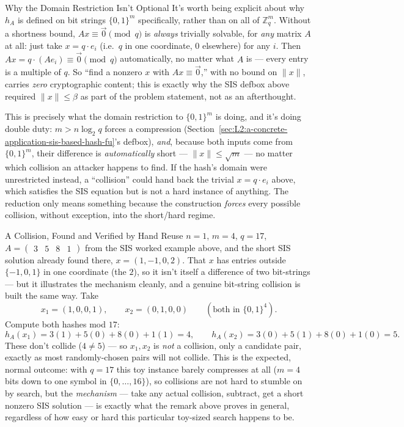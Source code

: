 \begin{rmkbox}{Why the Domain Restriction Isn't Optional}
It's worth being explicit about why $h_A$ is defined on bit strings $\{0,1\}^m$ specifically, rather than on all of $\mathbb{Z}_q^m$. Without a shortness bound, $Ax \equiv \vec 0 \pmod q$ is \emph{always} trivially solvable, for \emph{any} matrix $A$ at all: just take $x = q \cdot e_i$ (i.e.\ $q$ in one coordinate, $0$ elsewhere) for any $i$. Then $Ax = q\cdot(Ae_i) \equiv \vec 0 \pmod q$ automatically, no matter what $A$ is --- every entry is a multiple of $q$. So ``find a nonzero $x$ with $Ax\equiv\vec 0$,'' with no bound on $\|x\|$, carries \emph{zero} cryptographic content; this is exactly why the SIS defbox above required $\|x\|\le\beta$ as part of the problem statement, not as an afterthought.

This is precisely what the domain restriction to $\{0,1\}^m$ is doing, and it's doing double duty: $m > n\log_2 q$ forces a compression (Section~\ref{sec:L2:a-concrete-application-sis-based-hash-fu}'s defbox), \emph{and}, because both inputs come from $\{0,1\}^m$, their difference is \emph{automatically} short --- $\|x\|\le\sqrt m$ --- no matter which collision an attacker happens to find. If the hash's domain were unrestricted instead, a ``collision'' could hand back the trivial $x=q\cdot e_i$ above, which satisfies the SIS equation but is not a hard instance of anything. The reduction only means something because the construction \emph{forces} every possible collision, without exception, into the short/hard regime.
\end{rmkbox}

\begin{exbox}{A Collision, Found and Verified by Hand}
Reuse $n=1$, $m=4$, $q=17$, $A = \begin{pmatrix}3 & 5 & 8 & 1\end{pmatrix}$ from the SIS worked example above, and the short SIS solution already found there, $x = (1,-1,0,2)$. That $x$ has entries outside $\{-1,0,1\}$ in one coordinate (the $2$), so it isn't itself a difference of two bit-strings --- but it illustrates the mechanism cleanly, and a genuine bit-string collision is built the same way. Take
$$
x_1 = (1,0,0,1), \qquad x_2 = (0,1,0,0) \qquad (\text{both in } \{0,1\}^4).
$$
Compute both hashes mod $17$:
$$
h_A(x_1) = 3(1)+5(0)+8(0)+1(1) = 4, \qquad h_A(x_2) = 3(0)+5(1)+8(0)+1(0) = 5.
$$
These don't collide ($4 \ne 5$) --- so $x_1,x_2$ is \emph{not} a collision, only a candidate pair, exactly as most randomly-chosen pairs will not collide. This is the expected, normal outcome: with $q=17$ this toy instance barely compresses at all ($m=4$ bits down to one symbol in $\{0,\ldots,16\}$), so collisions are not hard to stumble on by search, but the \emph{mechanism} --- take any actual collision, subtract, get a short nonzero SIS solution --- is exactly what the remark above proves in general, regardless of how easy or hard this particular toy-sized search happens to be.
\end{exbox}

